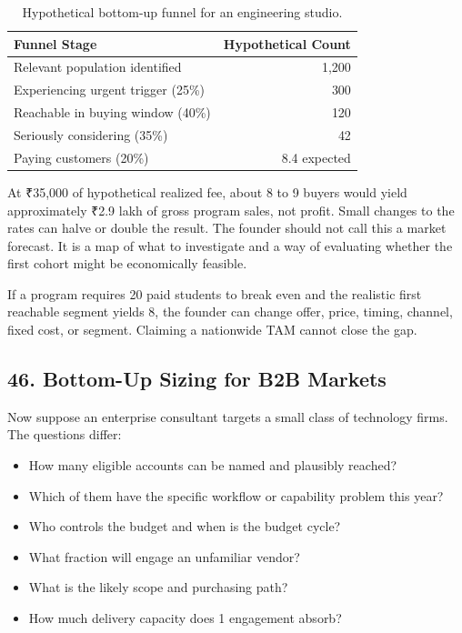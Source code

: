 \begin{table}[htbp]
\centering
\small
\begin{tabularx}{\columnwidth}{X r}
\toprule
\textbf{Funnel Stage} & \textbf{Hypothetical Count} \\
\midrule
Relevant population identified & 1,200 \\
Experiencing urgent trigger (25\%) & 300 \\
Reachable in buying window (40\%) & 120 \\
Seriously considering (35\%) & 42 \\
Paying customers (20\%) & 8.4 expected \\
\bottomrule
\end{tabularx}
\caption{Hypothetical bottom-up funnel for an engineering studio.}
\label{tab:ch7-studio-funnel}
\end{table}

At ₹35,000 of hypothetical realized fee, about 8 to 9 buyers would yield approximately ₹2.9 lakh of gross program sales, not profit. Small changes to the rates can halve or double the result. The founder should not call this a market forecast. It is a map of what to investigate and a way of evaluating whether the first cohort might be economically feasible.

If a program requires 20 paid students to break even and the realistic first reachable segment yields 8, the founder can change offer, price, timing, channel, fixed cost, or segment. Claiming a nationwide TAM cannot close the gap.

\subsection*{46. Bottom-Up Sizing for B2B Markets}

Now suppose an enterprise consultant targets a small class of technology firms. The questions differ:

\begin{itemize}
    \item How many eligible accounts can be named and plausibly reached?
    \item Which of them have the specific workflow or capability problem this year?
    \item Who controls the budget and when is the budget cycle?
    \item What fraction will engage an unfamiliar vendor?
    \item What is the likely scope and purchasing path?
    \item How much delivery capacity does 1 engagement absorb?
\end{itemize}

